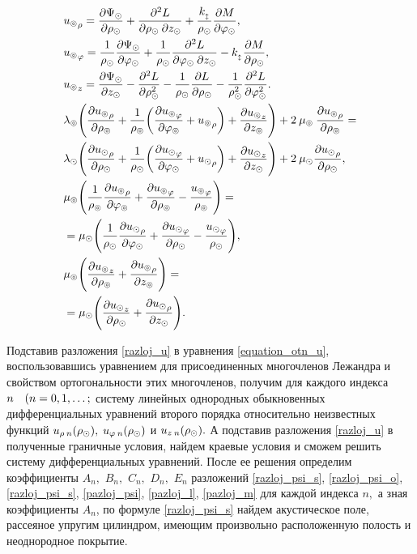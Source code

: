 \begin{align}
&{u_\circledcirc}_\rho=\frac{\partial \Psi_\odot}{\partial\rho_\odot}+\frac{\partial^2 L}{\partial\rho_\odot\:\partial z_\odot}+\frac{k_{_\updownarrow}}{\rho_\odot}\frac{\partial M}{\partial \varphi_\odot},\\
&{u_\circledcirc}_\varphi=\frac{1}{\rho_\odot}\frac{\partial \Psi_\odot}{\partial \varphi_\odot}+\frac{1}{\rho_\odot}\frac{\partial^{2} L}{\partial\varphi_\odot\: \partial z_\odot}-k_{_\updownarrow}\frac{\partial M}{\partial \rho_\odot},\\
&{u_\circledcirc}_z=\frac{\partial\Psi_\odot}{\partial z_\odot}-\frac{\partial^{2} L}{\partial \rho^2_\odot}-\frac{1}{\rho_\odot}\frac{\partial L}{\partial \rho_\odot}-\frac{1}{\rho^2_\odot}\frac{\partial^2L}{\partial\varphi^2_\odot}.\\
&\lambda_\circledcirc\Biggl(\frac{\partial {u_\circledcirc}_{\rho}}{\partial \rho_\circledcirc}+\frac{1}{\rho_\circledcirc}\biggl(\frac{\partial {u_\circledcirc}_\varphi}{\partial\varphi_\circledcirc}+{u_\circledcirc}_{\rho}\biggr)+\frac{\partial {u_\circledcirc}_z}{\partial z_\circledcirc}\Biggr)+2\:\mu_\circledcirc\:\frac{\partial {u_\circledcirc}_{\rho}}{\partial \rho_\circledcirc}=\\
&\lambda_\odot\Biggl(\frac{\partial {u_\odot}_{\rho}}{\partial \rho_\odot}+\frac{1}{\rho_\odot}\biggl(\frac{\partial {u_\odot}_{\varphi}}{\partial\varphi_\odot}+{u_\odot}_{\rho}\biggr)+\frac{\partial {u_\odot}_{z}}{\partial z_\odot}\Biggr)+2\:\mu_\odot\frac{\partial {u_\odot}_{\rho}}{\partial \rho_\odot},\\
&\mu_\circledcirc\Biggl(\frac{1}{\rho_\circledcirc}\frac{\partial {u_\circledcirc}_{\rho}}{\partial\varphi_\circledcirc}+\frac{\partial {u_\circledcirc}_{\varphi}}{\partial \rho_\circledcirc}-\frac{{u_\circledcirc}_{\varphi}}{\rho_\circledcirc}\Biggr)=\\
&=\mu_\odot\Biggl(\frac{1}{\rho_\odot}\frac{\partial {u_\odot}_{\rho}}{\partial\varphi_\odot}+\frac{\partial {u_\odot}_{\varphi}}{\partial \rho_\odot}-\frac{{u_\odot}_{\varphi}}{\rho_\odot}\Biggr),\\
&\mu_\circledcirc\Biggl(\frac{\partial {u_\circledcirc}_z}{\partial \rho_\circledcirc}+\frac{\partial {u_\circledcirc}_{\rho}}{\partial z_\circledcirc}\Biggr)=\\
&=\mu_\odot\Biggl(\frac{\partial {u_\odot}_{z}}{\partial \rho_\odot}+\frac{\partial {u_\odot}_{\rho}}{\partial z_\odot}\Biggr).
\end{align}

Подставив разложения \eqref{razloj_u} в уравнения \eqref{equation_otn_u}, воспользовавшись уравнением для присоединенных многочленов Лежандра и свойством ортогональности этих многочленов, получим для каждого индекса $n \quad(n = 0,1,\ldots;$ систему линейных однородных обыкновенных дифференциальных уравнений второго порядка относительно неизвестных функций $u_{\rho\:n}(\rho_\odot),$ $u_{\varphi\:n}(\rho_\odot)$ и $u_{z\:n}(\rho_\odot).$ А подставив разложения \eqref{razloj_u} в полученные граничные условия, найдем краевые условия и сможем решить  систему дифференциальных уравнений. После ее решения определим коэффициенты $A_n,$ $B_n,$ $C_n,$ $D_n,$ $E_n$ разложений  \eqref{razloj_psi_s}, \eqref{razloj_psi_o}, \eqref{razloj_psi_s}, \eqref{pazloj_psi}, \eqref{pazloj_l}, \eqref{pazloj_m} для каждой индекса $n,$ а зная коэффициенты ${A}_{n}$, по формуле \eqref{razloj_psi_s} найдем акустическое поле, рассеяное упругим цилиндром, имеющим произвольно расположенную полость и неоднородное покрытие.
\newpage
